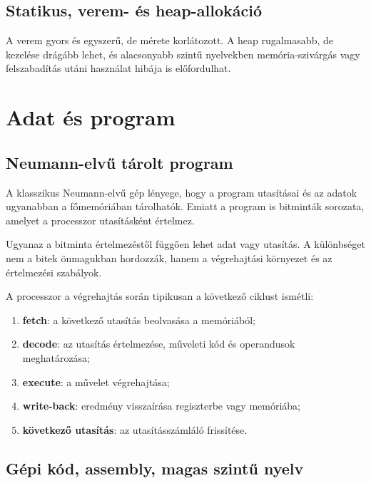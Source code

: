 \subsection{Statikus, verem- és heap-allokáció}

\begin{center}

\end{center}

A verem gyors és egyszerű, de mérete korlátozott. A heap rugalmasabb, de kezelése drágább lehet, és alacsonyabb szintű nyelvekben memória-szivárgás vagy felszabadítás utáni használat hibája is előfordulhat.

\section{Adat és program}

\subsection{Neumann-elvű tárolt program}

A klasszikus Neumann-elvű gép lényege, hogy a program utasításai és az adatok ugyanabban a főmemóriában tárolhatók. Emiatt a program is bitminták sorozata, amelyet a processzor utasításként értelmez.

\begin{summarybox}
Ugyanaz a bitminta értelmezéstől függően lehet adat vagy utasítás. A különbséget nem a bitek önmagukban hordozzák, hanem a végrehajtási környezet és az értelmezési szabályok.
\end{summarybox}

A processzor a végrehajtás során tipikusan a következő ciklust ismétli:

\begin{enumerate}
  \item \textbf{fetch}: a következő utasítás beolvasása a memóriából;
  \item \textbf{decode}: az utasítás értelmezése, műveleti kód és operandusok meghatározása;
  \item \textbf{execute}: a művelet végrehajtása;
  \item \textbf{write-back}: eredmény visszaírása regiszterbe vagy memóriába;
  \item \textbf{következő utasítás}: az utasításszámláló frissítése.
\end{enumerate}

\subsection{Gépi kód, assembly, magas szintű nyelv}

